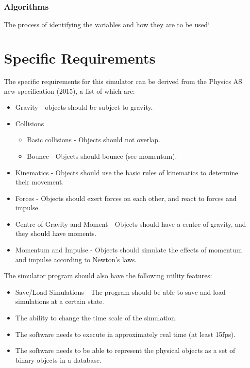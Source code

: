 \subsubsection{Algorithms}
	The process of identifying the variables and how they are to be used`		
	


\section{Specific Requirements}
The specific requirements for this simulator can be derived from the Physics AS new specification (2015), a list of which are:
\begin{itemize}
	\item Gravity  - objects should be subject to gravity.
	\item Collisions
	\begin{itemize}
		\item Basic collisions - Objects should not overlap.
		\item Bounce - Objects should bounce (see momentum).
	\end{itemize}
	\item Kinematics - Objects should use the basic rules of kinematics to determine their movement.
	\item Forces - Objects should exert forces on each other, and react to forces and impulse.
	\item Centre of Gravity and Moment - Objects should have a centre of gravity, and they should have moments.
	\item Momentum and Impulse - Objects should simulate the effects of momentum and impulse according to Newton's laws.
\end{itemize}

The simulator program should also have the following utility features:
\begin{itemize}
	\item Save/Load Simulations - The program should be able to save and load simulations at a certain state.
	\item The ability to change the time scale of the simulation.
	\item The software needs to execute in approximately real time (at least 15fps).
	\item The software needs to be able to represent the physical objects as a set of binary objects in a database.

\end{itemize}

